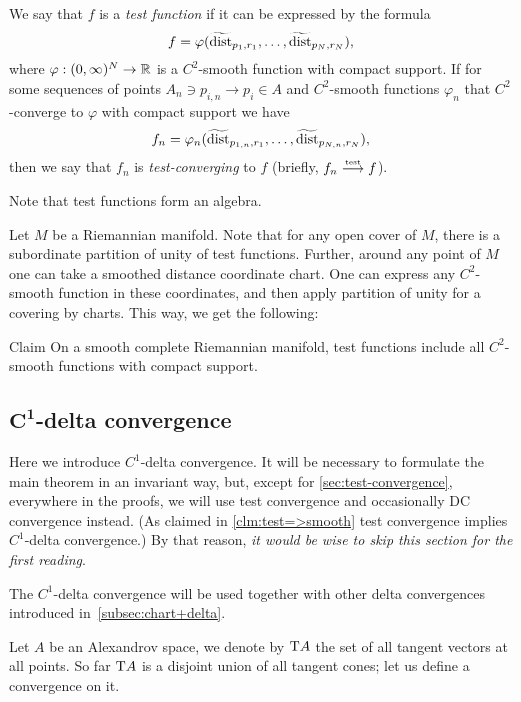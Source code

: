 We say that $f$ is a \emph{test function} if it can be expressed by the formula
$$f=\varphi( \widetilde{\operatorname{\rm dist}}_{p_1,r_1}, \dots,   \widetilde{\operatorname{\rm dist}}_{p_N,r_N}),$$
where $\varphi:(0,\infty)^N\to\mathbb{R}$ is a $C^2$-smooth function with compact support.
If for some sequences of points $A_n\ni p_{i,n}\to p_i\in A$ and $C^2$-smooth functions $\varphi_n$ that $C^2$-converge to $\varphi$ with compact support we have
$$f_n=\varphi_n( \widetilde{\operatorname{\rm dist}}_{p_{1,n},r_1},\dots,   \widetilde{\operatorname{\rm dist}}_{p_{N,n},r_N}),$$
then we say that $f_n$ is \emph{test-converging} to $f$ (briefly, $f_n\zz\testto f$).

Note that test functions form an algebra.

Let $M$ be a Riemannian manifold.
Note that for any open cover of $M$, there is a subordinate partition of unity of test functions.
Further, around any point of $M$ one can take a smoothed distance 
coordinate chart.
One can express any $C^2$-smooth function in these 
coordinates, and then apply partition of unity for a covering by charts.
This way, we get the following:

\begin{thm}{Claim}
On a smooth complete Riemannian manifold, test functions
include all $C^2$-smooth functions with compact support.
\end{thm}

\subsection[\texorpdfstring{$C^1$-delta convergence}{C¹-delta convergence}]%
{$\bm{C^1}$-delta convergence}\label{sec:concept}

Here we introduce $C^1$-delta convergence.
It will be necessary to formulate the main theorem in an invariant way, but, except for \ref{sec:test-convergence}, everywhere in the proofs, we will use test convergence and occasionally DC convergence instead.
(As claimed in \ref{clm:test=>smooth} test convergence implies $C^1$-delta convergence.)
By that reason, \textit{it would be wise to skip this section for the first reading}.

The $C^1$-delta convergence will be used together with other delta convergences introduced in~\ref{subsec:chart+delta}.

Let $A$ be an Alexandrov space, we denote by $\mathrm{T} A$ the set of all tangent vectors at all points.
So far $\mathrm{T} A$ is a disjoint union of all tangent cones;
let us define a convergence on it.

